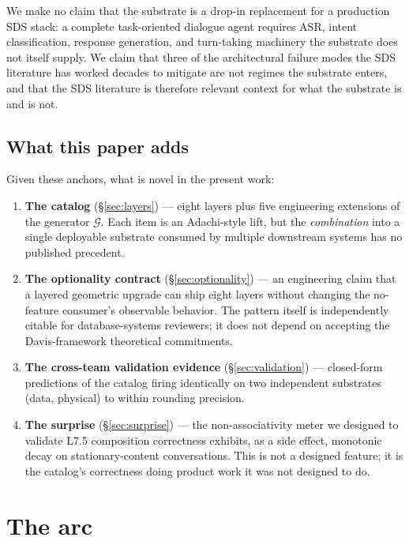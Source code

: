 \documentclass[11pt,letterpaper]{article}
\begin{document}
We make no claim that the substrate is a drop-in replacement for a
production SDS stack: a complete task-oriented dialogue agent
requires ASR, intent classification, response generation, and
turn-taking machinery the substrate does not itself supply. We
claim that three of the architectural failure modes the SDS
literature has worked decades to mitigate are not regimes the
substrate enters, and that the SDS literature is therefore relevant
context for what the substrate is and is not.

\subsection{What this paper adds}

Given these anchors, what is novel in the present work:

\begin{enumerate}[nosep]
\item \textbf{The catalog} (\S\ref{sec:layers}) --- eight layers plus
  five engineering extensions of the generator $\mathcal{G}$. Each
  item is an Adachi-style lift, but the \emph{combination} into a
  single deployable substrate consumed by multiple downstream systems
  has no published precedent.
\item \textbf{The optionality contract} (\S\ref{sec:optionality}) ---
  an engineering claim that a layered geometric upgrade can ship
  eight layers without changing the no-feature consumer's observable
  behavior. The pattern itself is independently citable for
  database-systems reviewers; it does not depend on accepting the
  Davis-framework theoretical commitments.
\item \textbf{The cross-team validation evidence}
  (\S\ref{sec:validation}) --- closed-form predictions of the catalog
  firing identically on two independent substrates (data, physical)
  to within rounding precision.
\item \textbf{The surprise} (\S\ref{sec:surprise}) --- the
  non-associativity meter we designed to validate L7.5 composition
  correctness exhibits, as a side effect, monotonic decay on
  stationary-content conversations. This is not a designed feature;
  it is the catalog's correctness doing product work it was not
  designed to do.
\end{enumerate}


\section{The arc}
\label{sec:arc}
\end{document}
